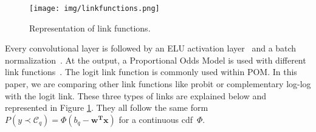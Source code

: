 \documentclass[journal]{IEEEtran}
\begin{document}
	\begin{figure}[!t]
		\centering
		\texttt{[image: img/linkfunctions.png]}
		\caption{Representation of link functions.}
		\label{fig:linkfunctions}
	\end{figure}
	
	Every convolutional layer is followed by an ELU activation layer~\cite{clevert2015fast} and a batch normalization~\cite{ioffe2015batch}. At the output, a Proportional Odds Model is used with different link functions~\cite{agresti2010analysis}. The logit link function is commonly used within POM. In this paper, we are comparing other link functions like probit or complementary log-log with the logit link. These three types of links are explained below and represented in Figure \ref{fig:linkfunctions}. They all follow the same form $P(y \prec \mathcal{C}_q) = \Phi(b_q-\mathbf{w^Tx})$ for a continuous cdf~$\Phi$.
	
\end{document}

